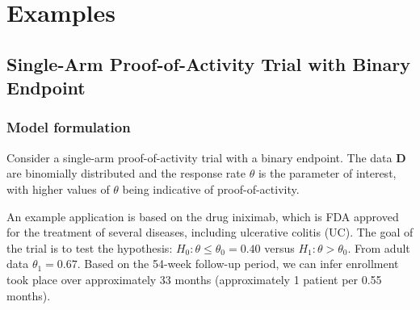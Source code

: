 \documentclass[12pt]{article}
\begin{document}



%


\section{Examples}

\subsection{Single-Arm Proof-of-Activity Trial with Binary Endpoint}
\subsubsection{Model formulation}
Consider a single-arm proof-of-activity trial with a binary endpoint. The data $\mathbf{D}$ are binomially distributed and the response rate $\theta$ is the parameter of interest, with higher values of $\theta$ being indicative of proof-of-activity. 

An example application is based on the drug iniximab, which is FDA approved for the treatment of several diseases, including ulcerative colitis (UC). The goal of the trial is to test the hypothesis: $H_0:\theta\leq\theta_0=0.40$ versus $H_1:\theta>\theta_0$. From adult data $\theta_1=0.67$. Based on the 54-week follow-up period, we can infer enrollment took place over approximately 33 months (approximately 1 patient per 0.55 months).
\end{document}
